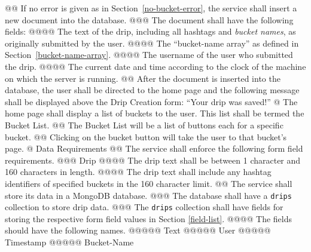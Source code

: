 \documentclass{article}
\begin{document}
\begin{easylist}[articletoc]
@@ If no error is given as in Section~\ref{no-bucket-error}, the service shall insert a new document into the database.
@@@ \label{field-list}The document shall have the following fields:
@@@@ The text of the drip, including all hashtags and \textit{bucket names}, as originally submitted by the user.
@@@@ The ``bucket-name array'' as defined in Section~\ref{bucket-name-array}.
@@@@ The username of the user who submitted the drip.
@@@@ The current date and time according to the clock of the machine on which the server is running.
@@ After the document is inserted into the database, the user shall be directed to the home page and the following message shall be displayed above the Drip Creation form: ``Your drip was saved!''
@ The home page shall display a list of buckets to the user. This list shall be termed the Bucket List.
@@ The Bucket List will be a list of buttons each for a specific bucket.
@@ Clicking on the bucket button will take the user to that bucket’s page.
@ Data Requirements
@@ The service shall enforce the following form field requirements.
@@@ Drip
@@@@ The drip text shall be between 1 character and 160 characters in length.
@@@@ The drip text shall include any hashtag identifiers of specified buckets in the 160 character limit.
@@ The service shall store its data in a MongoDB database.
@@@ The database shall have a \texttt{drips} collection to store drip data.
@@@ The \texttt{drips} collection shall have fields for storing the respective form field values in Section \ref{field-list}.
@@@@ The fields should have the following names.
@@@@@ Text
@@@@@ User
@@@@@ Timestamp
@@@@@ Bucket-Name

\end{easylist}
\end{document}

